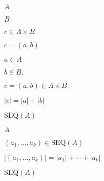 \documentclass[10pt]{book}
\begin{document}
\begin{mdSnippets}
\begin{mdInlineSnippet}[7fc56270e7a70fa81a5935b72eacbe29]
$A$\end{mdInlineSnippet}%
\begin{mdInlineSnippet}%
$B$\end{mdInlineSnippet}%
\begin{mdInlineSnippet}[7a381d436832fead188f4481d2235fb6]%
$c\in A\times B$\end{mdInlineSnippet}%
\begin{mdInlineSnippet}[d6ef0f98312ac5ec655fae115532ce14]%
$c = (a,b)$\end{mdInlineSnippet}%
\begin{mdInlineSnippet}[186d877666fa2c6f92794b782c19456a]%
$a\in A$\end{mdInlineSnippet}%
\begin{mdInlineSnippet}[89f46eecb6b02f2bb64e544df4251247]%
$b\in B.$\end{mdInlineSnippet}%
\begin{mdInlineSnippet}[d85c1b0673721de53a71b0624ebf7096]%
$c=(a,b)\in A\times B$\end{mdInlineSnippet}%
\begin{mdInlineSnippet}[5bfd6ae953cc5361679d57a6d2115176]%
$|c|=|a|+|b|$\end{mdInlineSnippet}%
\begin{mdInlineSnippet}[9878bdd1da561a9086d4e48ed43ae473]%
$\text{SEQ}(A)$\end{mdInlineSnippet}%
\begin{mdInlineSnippet}[7fc56270e7a70fa81a5935b72eacbe29]%
$A$\end{mdInlineSnippet}%
\begin{mdInlineSnippet}[c074501f6ced068e7491793962340d62]%
$(a_1,\ldots,a_k)\in \text{SEQ}(A)$\end{mdInlineSnippet}%
\begin{mdInlineSnippet}[e2faed63a4e3ee2b569354b9a51cc2f5]%
$|(a_1,\ldots,a_k)|=|a_1|+\cdots+|a_k|$\end{mdInlineSnippet}%
\begin{mdInlineSnippet}[9878bdd1da561a9086d4e48ed43ae473]%
$\text{SEQ}(A)$\end{mdInlineSnippet}%
\begin{mdInlineSnippet}%

\end{mdInlineSnippet}
\end{mdSnippets}
\end{document}
